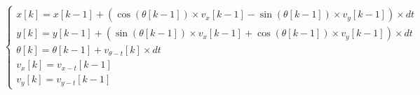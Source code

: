\documentclass[acronym, symbols, table]{fei}
\begin{document}
			\begin{equation}\label{eq:implementacao_atualizacao_cenario_1}
				\begin{cases}
						x[k] = x[k-1] + (\cos(\theta[k-1]) \times v_x[k-1] - \sin(\theta[k-1]) \times v_y[k-1]) \times dt \\
						y[k] = y[k-1] + (\sin(\theta[k-1]) \times v_x[k-1] + \cos(\theta[k-1]) \times v_y[k-1]) \times dt  \\
						\theta[k] = \theta[k-1] + v_{\theta-t}[k] \times dt \\
						v_x[k] = v_{x-t}[k-1]\\
						v_y[k] = v_{y-t}[k-1]
					\end{cases}
			\end{equation}
		
%		
%			
%				
\end{document}

